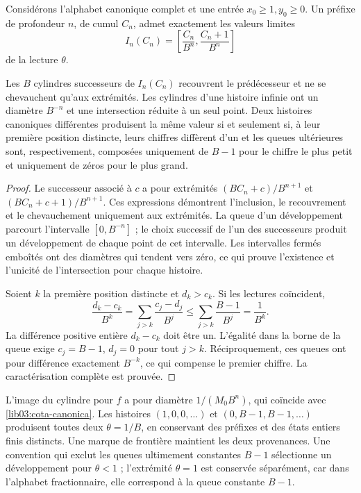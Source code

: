 Considérons l'alphabet canonique complet et une entrée \(x_0\geq1,y_0\geq0\). Un préfixe de profondeur \(n\), de cumul \(C_n\), admet exactement les valeurs limites
\begin{equation}
 I_n(C_n)=\left[\frac{C_n}{B^n},\frac{C_n+1}{B^n}\right]
 \label{lib03:cilindro}
\end{equation}
de la lecture \(\theta\).

\begin{theorem}
\label{lib03:teo-cilindros}
Les \(B\) cylindres successeurs de \(I_n(C_n)\) recouvrent le prédécesseur et ne se
chevauchent qu’aux extrémités. Les cylindres d’une histoire infinie
ont un diamètre \(B^{-n}\) et une intersection réduite à un seul point.
Deux histoires canoniques différentes produisent la même valeur si et seulement
si, à leur première position distincte, leurs chiffres diffèrent d’un et les
queues ultérieures sont, respectivement, composées uniquement de \(B-1\) pour le chiffre
le plus petit et uniquement de zéros pour le plus grand.
\end{theorem}

\begin{proof}
Le successeur associé à \(c\) a pour extrémités
\((BC_n+c)/B^{n+1}\) et \((BC_n+c+1)/B^{n+1}\).
Ces expressions démontrent l’inclusion, le recouvrement et le chevauchement uniquement
aux extrémités. La queue d’un développement parcourt l’intervalle
\([0,B^{-n}]\) ; le choix successif de l’un des successeurs produit un
développement de chaque point de cet intervalle. Les intervalles fermés
emboîtés ont des diamètres qui tendent vers zéro, ce qui prouve l’existence
et l’unicité de l’intersection pour chaque histoire.

Soient \(k\) la première position distincte et \(d_k>c_k\). Si les
lectures coïncident,
\[
 \frac{d_k-c_k}{B^k}
 =\sum_{j>k}\frac{c_j-d_j}{B^j}
 \leq\sum_{j>k}\frac{B-1}{B^j}=\frac1{B^k}.
\]
La différence positive entière \(d_k-c_k\) doit être un. L’égalité
dans la borne de la queue exige \(c_j=B-1\), \(d_j=0\) pour tout
\(j>k\). Réciproquement, ces queues ont pour différence exactement
\(B^{-k}\), ce qui compense le premier chiffre. La
caractérisation complète est prouvée.
\end{proof}

L’image du cylindre pour \(f\) a pour diamètre
\(1/(M_0B^n)\), qui coïncide avec \eqref{lib03:cota-canonica}.
Les histoires \((1,0,0,\ldots)\) et
\((0,B-1,B-1,\ldots)\) produisent toutes deux \(\theta=1/B\), en conservant
des préfixes et des états entiers finis distincts. Une marque de frontière
maintient les deux provenances. Une convention qui exclut les queues ultimement
constantes \(B-1\) sélectionne un développement pour \(\theta<1\) ;
l’extrémité \(\theta=1\) est conservée séparément, car dans
l’alphabet fractionnaire, elle correspond à la queue constante \(B-1\).

